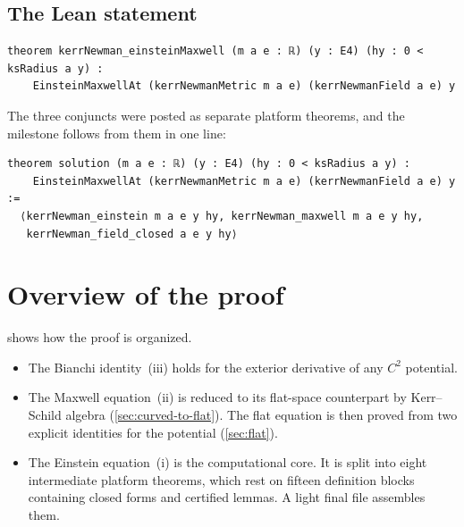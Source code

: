 \documentclass[11pt]{article}
\theoremstyle{definition}
\theoremstyle{remark}
\begin{document}
\subsection{The Lean statement}

\begin{lstlisting}
theorem kerrNewman_einsteinMaxwell (m a e : ℝ) (y : E4) (hy : 0 < ksRadius a y) :
    EinsteinMaxwellAt (kerrNewmanMetric m a e) (kerrNewmanField a e) y
\end{lstlisting}
The three conjuncts were posted as separate platform theorems, and the milestone follows from them in one line:
\begin{lstlisting}
theorem solution (m a e : ℝ) (y : E4) (hy : 0 < ksRadius a y) :
    EinsteinMaxwellAt (kerrNewmanMetric m a e) (kerrNewmanField a e) y :=
  ⟨kerrNewman_einstein m a e y hy, kerrNewman_maxwell m a e y hy,
   kerrNewman_field_closed a e y hy⟩
\end{lstlisting}

\section{Overview of the proof}\label{sec:overview}

 shows how the proof is organized.
\begin{itemize}
  \item The Bianchi identity~(iii) holds for the exterior derivative of any $C^2$ potential.
  \item The Maxwell equation~(ii) is reduced to its flat-space counterpart by Kerr--Schild algebra (\cref{sec:curved-to-flat}).
  The flat equation is then proved from two explicit identities for the potential (\cref{sec:flat}).
  \item The Einstein equation~(i) is the computational core.
  It is split into eight intermediate platform theorems, which rest on fifteen definition blocks containing closed forms and certified lemmas.
  A light final file assembles them.
\end{itemize}
\end{document}
